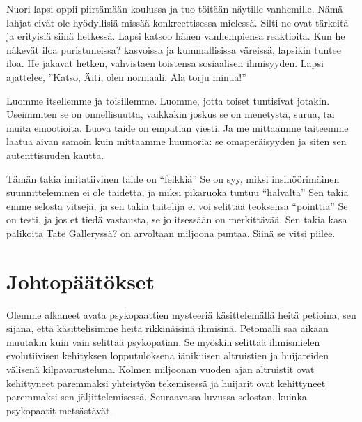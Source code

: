 Nuori lapsi oppii piirtämään koulussa ja tuo töitään näytille vanhemille. Nämä lahjat eivät ole hyödyllisiä missää konkreettisessa mielessä. Silti ne ovat tärkeitä ja erityisiä siinä hetkessä. Lapsi katsoo hänen vanhempiensa reaktioita. Kun he näkevät iloa puristuneissa? kasvoissa ja kummallisissa väreissä, lapsikin tuntee iloa. He jakavat hetken, vahvistaen toistensa sosiaalisen ihmisyyden. Lapsi ajattelee, ''Katso, Äiti, olen normaali. Älä torju minua!''

Luomme itsellemme ja toisillemme. Luomme, jotta toiset tuntisivat jotakin. Useimmiten se on onnellisuutta, vaikkakin joskus se on menetystä, surua, tai muita emootioita. Luova taide on empatian viesti. Ja me mittaamme taiteemme laatua aivan samoin kuin mittaamme huumoria: se omaperäisyyden ja siten sen autenttisuuden kautta.

Tämän takia imitatiivinen taide on ``feikkiä'' Se on syy, miksi insinöörimäinen suunnitteleminen ei ole taidetta, ja miksi pikaruoka tuntuu ``halvalta'' Sen takia emme selosta vitsejä, ja sen takia taitelija ei voi selittää teoksensa ``pointtia'' Se on testi, ja jos et tiedä vastausta, se jo itsessään on merkittävää. Sen takia kasa palikoita Tate Galleryssä? on arvoltaan miljoona puntaa. Siinä se vitsi piilee.

\section{Johtopäätökset}

Olemme alkaneet avata psykopaattien mysteeriä käsittelemällä heitä petioina, sen sijana, että käsittelisimme heitä rikkinäisinä ihmisinä. Petomalli saa aikaan muutakin kuin vain selittää psykopatian. Se myöskin selittää ihmismielen evolutiivisen kehityksen lopputuloksena iänikuisen altruistien ja huijareiden välisenä kilpavarusteluna. Kolmen miljoonan vuoden ajan altruistit ovat kehittyneet paremmaksi yhteistyön tekemisessä ja huijarit ovat kehittyneet paremmaksi sen jäljittelemisessä. Seuraavassa luvussa selostan, kuinka psykopaatit metsästävät.
